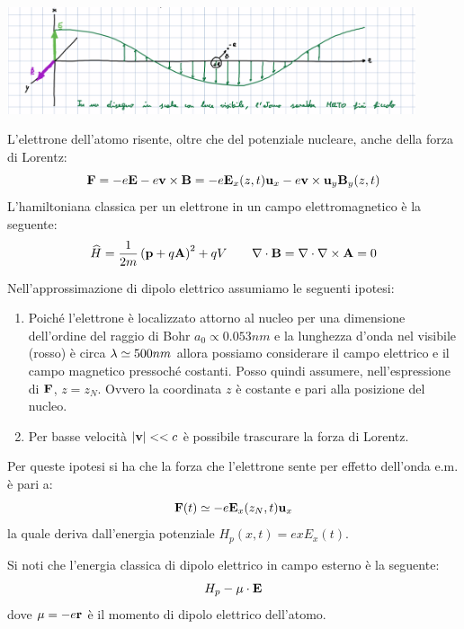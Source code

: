 \includegraphics[width=12cm, center]{onda_mono_lin_pol}

L'elettrone dell'atomo risente, oltre che del potenziale nucleare, anche della forza di Lorentz:
\begin{equation*}
    \mathbf{F} = -e\mathbf{E} - e\mathbf{v}\times\mathbf{B} = -e\mathbf{E}_x(z, t)\mathbf{u}_x -e\mathbf{v}\times \mathbf{u}_y\mathbf{B}_y(z, t)
\end{equation*}
L'hamiltoniana classica per un elettrone in un campo elettromagnetico è la seguente:
\begin{equation*}
    \widehat{H} = \frac{1}{2m} \left(\mathbf{p} + q\mathbf{A}\right)^2 + qV \qquad \nabla\cdot\mathbf{B} = \nabla\cdot\nabla\times\mathbf{A} = 0
\end{equation*}

Nell'approssimazione di dipolo elettrico assumiamo le seguenti ipotesi:
\begin{enumerate}
    \item Poiché l'elettrone è localizzato attorno al nucleo per una dimensione dell'ordine del raggio di Bohr $a_0 \propto 0.053 nm$ e la lunghezza d'onda nel visibile (rosso) è circa $\lambda \simeq 500 nm$ allora possiamo considerare il campo elettrico e il campo magnetico pressoché costanti. Posso quindi assumere, nell'espressione di $\mathbf{F}$, $z=z_N$. Ovvero la coordinata $z$ è costante e pari alla posizione del nucleo.
    
    \item Per basse velocità $|\mathbf{v}| << c$ è possibile trascurare la forza di Lorentz.
\end{enumerate}

Per queste ipotesi si ha che la forza che l'elettrone sente per effetto dell'onda e.m. è pari a:
\begin{equation}
    \mathbf{F}(t) \simeq -e\mathbf{E}_x(z_N, t)\mathbf{u}_x
\end{equation}
la quale deriva dall'energia potenziale $H_p(x, t) = e x E_x(t)$.

Si noti che l'energia classica di dipolo elettrico in campo esterno è la seguente:
\begin{equation}
    H_p -\mathbf{\mu} \cdot \mathbf{E}
\end{equation}
dove $\mathbf{\mu} = -e\mathbf{r}$ è il momento di dipolo elettrico dell'atomo.

